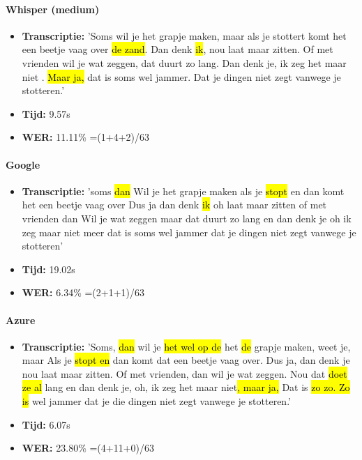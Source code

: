 \paragraph{Whisper (medium)}
\begin{itemize}
    \item \textbf{Transcriptie:} 'Soms wil je het grapje maken, maar als je stottert\hl{ }komt het een beetje vaag over \hl{de zand}. Dan denk \hl{ik}, nou laat maar zitten. Of met vrienden wil je wat zeggen, dat duurt zo lang. Dan denk je, ik zeg het maar niet\hl{ }. \hl{Maar ja,} dat is soms wel jammer. Dat je dingen niet zegt vanwege je stotteren.'
    \item \textbf{Tijd:} 9.57s
    \item \textbf{WER:} 11.11\% =(1+4+2)/63
\end{itemize}

\paragraph{Google}
\begin{itemize}
    \item \textbf{Transcriptie:} 'soms \hl{dan} Wil je het grapje maken\hl{ }als je \hl{stopt} en dan komt het een beetje vaag over Dus ja dan denk \hl{ik} oh laat maar zitten of met vrienden dan Wil je wat zeggen maar dat duurt zo lang en dan denk je oh ik zeg maar niet meer dat is soms wel jammer dat je dingen niet zegt vanwege je stotteren'
    \item \textbf{Tijd:} 19.02s
    \item \textbf{WER:} 6.34\% =(2+1+1)/63
\end{itemize}

\paragraph{Azure}
\begin{itemize}
\item \textbf{Transcriptie:} 'Soms, \hl{dan} wil je \hl{het wel op de} het \hl{de} grapje maken, weet je, maar Als je \hl{stopt en} dan komt dat een beetje vaag over. Dus ja, dan denk je nou laat maar zitten. Of met vrienden, dan wil je wat zeggen. Nou dat \hl{doet ze al} lang en dan denk je, oh, ik zeg het maar niet\hl{, maar ja,} Dat is \hl{zo zo. Zo is} wel jammer dat je die dingen niet zegt vanwege je stotteren.'
\item \textbf{Tijd:} 6.07s
\item \textbf{WER:} 23.80\% =(4+11+0)/63
\end{itemize}


